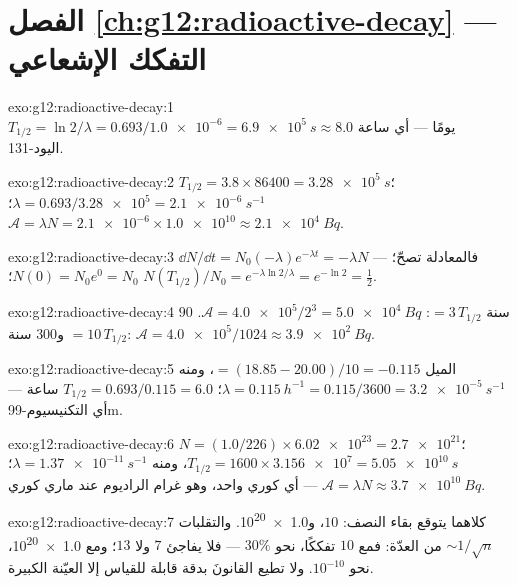 \section*{الفصل \ref{ch:g12:radioactive-decay} --- التفكك الإشعاعي}

\begin{solution}{exo:g12:radioactive-decay:1}
$T_{1/2} = \ln 2/\lambda = 0.693/\num{1.0e-6} = \qty{6.9e5}{s}
\approx 8.0$ يومًا --- أي ساعة اليود-131.
\end{solution}

\begin{solution}{exo:g12:radioactive-decay:2}
$T_{1/2} = 3.8 \times \num{86400} = \qty{3.28e5}{s}$؛
$\lambda = 0.693/\num{3.28e5} = \qty{2.1e-6}{s^{-1}}$؛
$\mathcal A = \lambda N = \num{2.1e-6} \times \num{1.0e10} \approx
\qty{2.1e4}{Bq}$.
\end{solution}

\begin{solution}{exo:g12:radioactive-decay:3}
$\dd N/\dd t = N_0(-\lambda)e^{-\lambda t} = -\lambda N$ ---
فالمعادلة تصحّ؛ $N(0) = N_0 e^0 = N_0$؛
$N(T_{1/2})/N_0 = e^{-\lambda \ln 2/\lambda} = e^{-\ln 2} =
\tfrac12$.
\end{solution}

\begin{solution}{exo:g12:radioactive-decay:4}
$90$ سنة $= 3\,T_{1/2}$: $\mathcal A = \num{4.0e5}/2^3 =
\qty{5.0e4}{Bq}$. و$300$ سنة $= 10\,T_{1/2}$:
$\mathcal A = \num{4.0e5}/1024 \approx \qty{3.9e2}{Bq}$.
\end{solution}

\begin{solution}{exo:g12:radioactive-decay:5}
الميل $= (18.85 - 20.00)/10 = -0.115$، ومنه
$\lambda = \qty{0.115}{h^{-1}} = 0.115/3600 = \qty{3.2e-5}{s^{-1}}$؛
$T_{1/2} = 0.693/0.115 = 6.0$ ساعة --- أي التكنيسيوم-99m.
\end{solution}

\begin{solution}{exo:g12:radioactive-decay:6}
$N = (1.0/226) \times \num{6.02e23} = \num{2.7e21}$؛
$T_{1/2} = 1600 \times \num{3.156e7} = \qty{5.05e10}{s}$، ومنه
$\lambda = \qty{1.37e-11}{s^{-1}}$؛
$\mathcal A = \lambda N \approx \qty{3.7e10}{Bq}$ --- أي كوري واحد، وهو
 غرام الراديوم عند ماري كوري.
\end{solution}

\begin{solution}{exo:g12:radioactive-decay:7}
كلاهما يتوقع بقاء النصف: $10$، و\num{1.0e20}. والتقلبات
$\sim 1/\sqrt{n}$ من العدّة: فمع $10$ تفككًا، نحو $30\%$ ---
فلا يفاجئ $7$ ولا $13$؛ ومع \num{1.0e20}، نحو
$10^{-10}$. ولا تطيع القانونَ بدقة قابلة للقياس إلا العيّنة
الكبيرة.
\end{solution}

